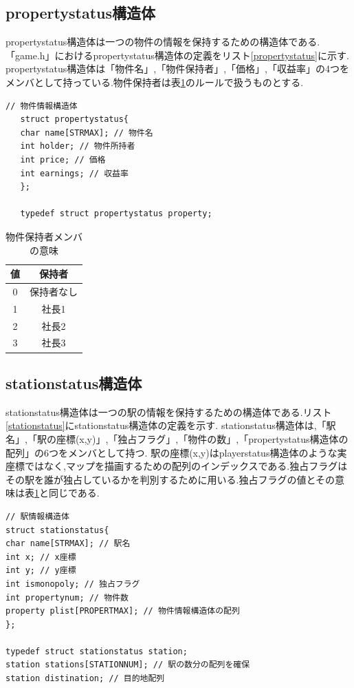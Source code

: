 \documentclass[a4j]{jarticle}
\begin{document}
    \subsection{propertystatus構造体}
    propertystatus構造体は一つの物件の情報を保持するための構造体である.「game.h」におけるpropertystatus構造体の定義をリスト\ref{propertystatus}に示す.
    propertystatus構造体は「物件名」,「物件保持者」,「価格」,「収益率」の4つをメンバとして持っている.物件保持者は表\ref{whohold}のルールで扱うものとする.
   \begin{lstlisting}[basicstyle=\ttfamily\footnotesize, frame=single,label=propertystatus,caption=propertystatus構造体の定義]
   // 物件情報構造体
   struct propertystatus{
   char name[STRMAX]; // 物件名
   int holder; // 物件所持者
   int price; // 価格
   int earnings; // 収益率
   };
   
   typedef struct propertystatus property;
   \end{lstlisting}
   
   \begin{table}[H]
     \caption{物件保持者メンバの意味}
   \label{whohold}
   \begin{center}
       \begin{tabular}{c|c}\hline
       値 & 保持者 \\ \hline \hline
         0 & 保持者なし \\
         1 & 社長1 \\
         2 & 社長2 \\
         3 & 社長3 \\ \hline
       \end{tabular}
   \end{center}
   \end{table}

    \subsection{stationstatus構造体}
stationstatus構造体は一つの駅の情報を保持するための構造体である.リスト\ref{stationstatus}にstationstatus構造体の定義を示す.
stationstatus構造体は,「駅名」,「駅の座標(x,y)」,「独占フラグ」,「物件の数」,「propertystatus構造体の配列」の6つをメンバとして持つ.
駅の座標(x,y)はplayerstatus構造体のような実座標ではなく,マップを描画するための配列のインデックスである.独占フラグは
その駅を誰が独占しているかを判別するために用いる.独占フラグの値とその意味は表\ref{whohold}と同じである.
\begin{lstlisting}[basicstyle=\ttfamily\footnotesize, frame=single,label=stationstatus,caption=stationstatus構造体の定義と初期化]
// 駅情報構造体
struct stationstatus{
char name[STRMAX]; // 駅名
int x; // x座標
int y; // y座標
int ismonopoly; // 独占フラグ
int propertynum; // 物件数
property plist[PROPERTMAX]; // 物件情報構造体の配列
};

typedef struct stationstatus station;
station stations[STATIONNUM]; // 駅の数分の配列を確保
station distination; // 目的地配列
\end{lstlisting}
\end{document}
